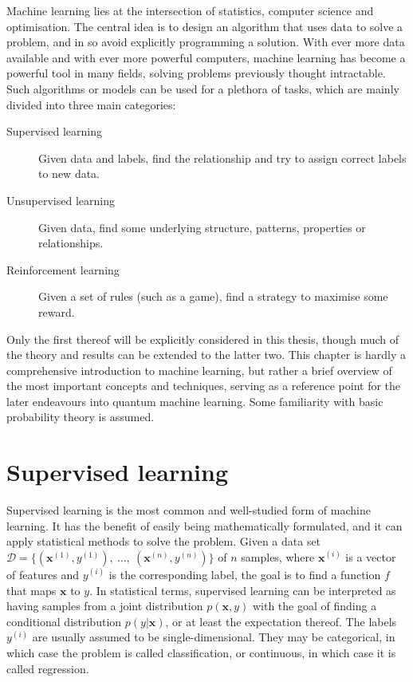 Machine learning lies at the intersection of statistics, computer science and optimisation.
The central idea is to design an algorithm that uses data to solve a problem, and in so avoid explicitly programming a solution.
With ever more data available and with ever more powerful computers, machine learning has become a powerful tool in many fields, solving problems previously thought intractable.
Such algorithms or models can be used for a plethora of tasks, which are mainly divided into three main categories:
\begin{description}

    \item[Supervised learning]
        Given data and labels, find the relationship and try to assign correct labels to new data.

    \item[Unsupervised learning]
        Given data, find some underlying structure, patterns, properties or relationships.

    \item[Reinforcement learning]
        Given a set of rules (such as a game), find a strategy to maximise some reward.

\end{description}
Only the first thereof will be explicitly considered in this thesis, though much of the theory and results can be extended to the latter two.
This chapter is hardly a comprehensive introduction to machine learning, but rather a brief overview of the most important concepts and techniques, serving as a reference point for the later endeavours into quantum machine learning.
Some familiarity with basic probability theory is assumed.

\section{Supervised learning}
Supervised learning is the most common and well-studied form of machine learning.
It has the benefit of easily being mathematically formulated, and it can apply statistical methods to solve the problem.
Given a data set
$
    \mathcal{D} = \{
    (\bm{x}^{(1)}, y^{(1)}), \
    \dots, \
    (\bm{x}^{(n)}, y^{(n)})
    \}
$
of $n$ samples, where $\bm{x}^{(i)}$ is a vector of features and $y^{(i)}$ is the corresponding label, the goal is to find a function $f$ that maps $\bm{x}$ to $y$.
In statistical terms, supervised learning can be interpreted as having samples from a joint distribution $p(\bm{x}, y)$ with the goal of finding a conditional distribution $p(y|\bm{x})$, or at least the expectation thereof.
The labels $y^{(i)}$ are usually assumed to be single-dimensional.
They may be categorical, in which case the problem is called classification, or continuous, in which case it is called regression.

